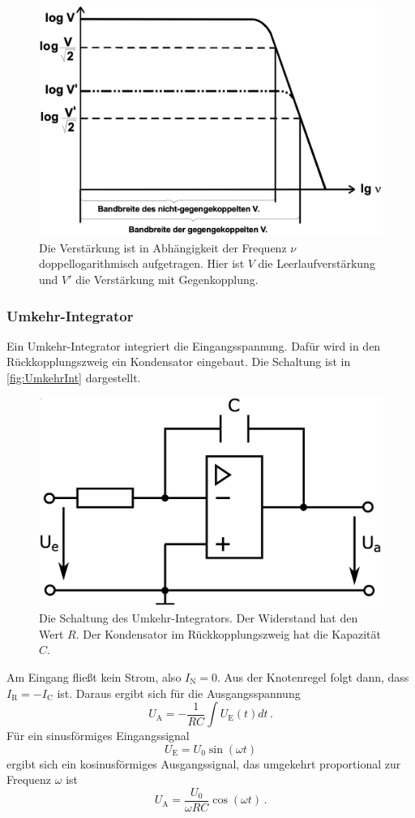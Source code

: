 \begin{figure}
    \centering
    \includegraphics[width=0.7\linewidth]{./figures/Bandbreite.png}
    \caption{Die Verstärkung ist in Abhängigkeit der Frequenz $\nu$ doppellogarithmisch aufgetragen. Hier ist $V$ die Leerlaufverstärkung und $V'$ die Verstärkung mit Gegenkopplung. \cite{V51old}}
\end{figure}


\subsubsection{Umkehr-Integrator}
Ein Umkehr-Integrator integriert die Eingangsspannung.
Dafür wird in den Rückkopplungszweig ein Kondensator eingebaut. Die Schaltung ist in \autoref{fig:UmkehrInt} dargestellt.

\begin{figure}
    \centering
    \includegraphics[width=0.7\linewidth]{./figures/2_Umkehr.png}
    \caption{Die Schaltung des Umkehr-Integrators. Der Widerstand hat den Wert $R$. Der Kondensator im Rückkopplungszweig hat die Kapazität $C$. \cite{V51}}
    \label{fig:UmkehrInt}
\end{figure}
\FloatBarrier

Am Eingang fließt kein Strom, also $I_\text{N} = 0$. Aus der Knotenregel folgt dann, dass $I_\text{R} = - I_\text{C}$ ist. Daraus ergibt sich für die Ausgangsspannung
\begin{equation*}
    U_\text{A} = - \frac{1}{R C} \int U_\text{E}(t) dt \, .
    \label{eq:Integrator}
\end{equation*}
Für ein sinusförmiges Eingangssignal
\begin{equation}
    U_\text{E} = U_0 \sin(\omega t)
    \label{eq:Sinus}
\end{equation}
ergibt sich ein kosinusförmiges Ausgangssignal, das umgekehrt proportional zur Frequenz $\omega$ ist
\begin{equation}
    U_\text{A} = \frac{U_0}{\omega R C} \cos(\omega t) \, .
    \label{eq:Int_Kosinus}
\end{equation}


